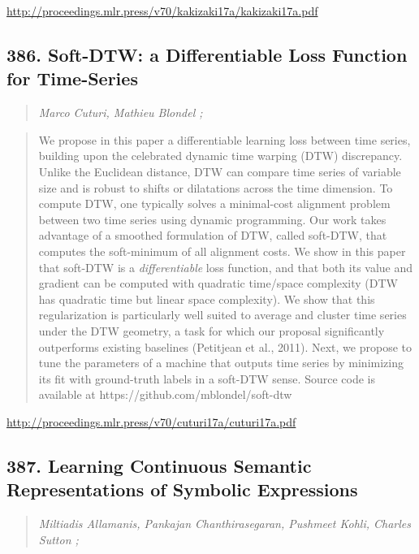 \documentclass{article}
\begin{document}
\href{http://proceedings.mlr.press/v70/kakizaki17a/kakizaki17a.pdf}{http://proceedings.mlr.press/v70/kakizaki17a/kakizaki17a.pdf}

\subsection{386. Soft-DTW: a Differentiable Loss Function for Time-Series}

\begin{quote}
\footnotesize{\textit{Marco Cuturi, Mathieu Blondel ;}}
\end{quote}

\begin{quote}
    We propose in this paper a differentiable learning loss between time series, building upon the celebrated dynamic time warping (DTW) discrepancy. Unlike the Euclidean distance, DTW can compare time series of variable size and is robust to shifts or dilatations across the time dimension. To compute DTW, one typically solves a minimal-cost alignment problem between two time series using dynamic programming. Our work takes advantage of a smoothed formulation of DTW, called soft-DTW, that computes the soft-minimum of all alignment costs. We show in this paper that soft-DTW is a \textit{differentiable} loss function, and that both its value and gradient can be computed with quadratic time/space complexity (DTW has quadratic time but linear space complexity). We show that this regularization is particularly well suited to average and cluster time series under the DTW geometry, a task for which our proposal significantly outperforms existing baselines (Petitjean et al., 2011). Next, we propose to tune the parameters of a machine that outputs time series by minimizing its fit with ground-truth labels in a soft-DTW sense. Source code is available at https://github.com/mblondel/soft-dtw  \end{quote}

\href{http://proceedings.mlr.press/v70/cuturi17a/cuturi17a.pdf}{http://proceedings.mlr.press/v70/cuturi17a/cuturi17a.pdf}

\subsection{387. Learning Continuous Semantic Representations of Symbolic Expressions}

\begin{quote}
\footnotesize{\textit{Miltiadis Allamanis, Pankajan Chanthirasegaran, Pushmeet Kohli, Charles Sutton ;}}
\end{quote}
\end{document}
